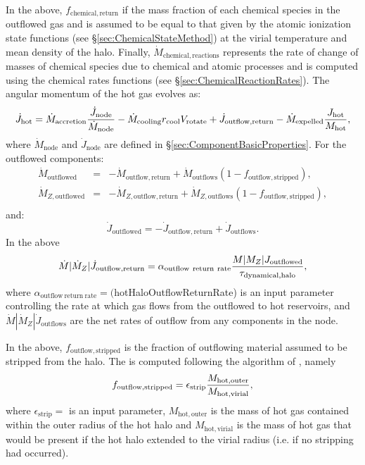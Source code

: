 In the above, $f_\mathrm{chemical,return}$ if the mass fraction of each chemical species in the outflowed gas and is assumed to be equal to that given by the atomic ionization state functions (see \S\ref{sec:ChemicalStateMethod}) at the virial temperature and mean density of the halo. Finally, $\dot{M}_\mathrm{chemical,reactions}$ represents the rate of change of masses of chemical species due to chemical and atomic processes and is computed using the chemical rates functions (see \S\ref{sec:ChemicalReactionRates}). The angular momentum of the hot gas evolves as:
\begin{equation}
 \dot{J}_\mathrm{hot} = \dot{M}_\mathrm{accretion} {\dot{J}_\mathrm{node} \over \dot{M}_\mathrm{node}} - \dot{M}_\mathrm{cooling} r_\mathrm{cool} V_\mathrm{rotate} + \dot{J}_\mathrm{outflow,return} - \dot{M}_\mathrm{expelled} {J_\mathrm{hot} \over M_\mathrm{hot}},
\end{equation}
where $\dot{M}_\mathrm{node}$ and $\dot{J}_\mathrm{node}$ are defined in \S\ref{sec:ComponentBasicProperties}. For the outflowed components:
\begin{eqnarray}
 \dot{M}_\mathrm{outflowed} &=& - \dot{M}_\mathrm{outflow,return} + \dot{M}_\mathrm{outflows} (1-f_\mathrm{outflow, stripped}), \\
 \dot{M}_{Z, \mathrm{outflowed}} &=& - \dot{M}_{Z, \mathrm{outflow,return}} + \dot{M}_{Z, \mathrm{outflows}} (1-f_\mathrm{outflow, stripped}), \\
\end{eqnarray}
and:
\begin{equation}
 \dot{J}_\mathrm{outflowed} = - \dot{J}_\mathrm{outflow,return} + \dot{J}_\mathrm{outflows}.
\end{equation}
In the above
\begin{equation}
 \dot{M}|\dot{M}_Z|\dot{J}_\mathrm{outflow,return} = \alpha_\mathrm{outflow~return~rate} {M|M_Z|J_\mathrm{outflowed}\over \tau_\mathrm{dynamical, halo}},
\end{equation}
where $\alpha_\mathrm{outflow~return~rate}=(${\normalfont \ttfamily hotHaloOutflowReturnRate}) is an input parameter controlling the rate at which gas flows from the outflowed to hot reservoirs, and $\dot{M}|\dot{M}_Z|\dot{J}_\mathrm{outflows}$ are the net rates of outflow from any components in the node.

In the above, $f_\mathrm{outflow, stripped}$ is the fraction of outflowing material assumed to be stripped from the halo. The is computed following the algorithm of \cite{font_colours_2008}, namely
\begin{equation}
f_\mathrm{outflow, stripped} = \epsilon_\mathrm{strip} {M_\mathrm{hot, outer} \over  M_\mathrm{hot, virial}},
\end{equation}
where $\epsilon_\mathrm{strip}=${\normalfont \ttfamily [hotHaloOutflowStrippingEfficiency]} is an input parameter, $M_\mathrm{hot, outer}$ is the mass of hot gas contained within the outer radius of the hot halo and $M_\mathrm{hot, virial}$ is the mass of hot gas that would be present if the hot halo extended to the virial radius (i.e. if no stripping had occurred).

